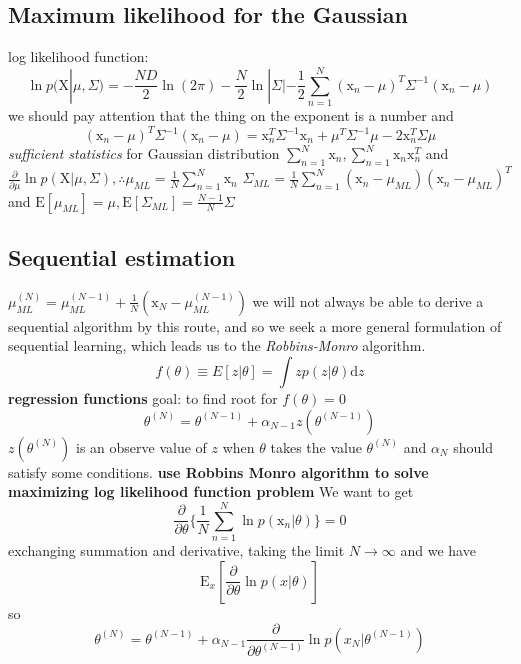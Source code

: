 \documentclass[a4paper]{book}
\begin{document}
\subsection{Maximum likelihood for the Gaussian }
log likelihood function:
\begin{equation}\label{1.2.12}
  \ln p(\mathrm X|\mu,\Sigma) = -\frac{ND}2\ln(2\pi) - \frac N2\ln|\Sigma|-\frac12\sum_{n=1}^N(\mathrm x_n-\mu)^T\Sigma^{-1}(\mathrm x_n-\mu)
\end{equation}
we should pay attention that the thing on the exponent is a number and
\begin{equation}\label{1.2.13}
  (\mathrm x_n-\mu)^T\Sigma^{-1}(\mathrm x_n-\mu) = \mathrm x_n^T\Sigma^{-1}\mathrm x_n+\mu^T\Sigma^{-1}\mu-2\mathrm x_n^T\Sigma\mu
\end{equation}
\emph{sufficient statistics} for Gaussian distribution $\sum_{n=1}^N\mathrm x_n, \sum_{n=1}^N\mathrm x_n\mathrm x_n^T$ and  $\frac{\partial}{\partial \mu}\ln p(\mathrm X|\mu,\Sigma), \therefore\mu_{ML} = \frac1N\sum_{n=1}^N\mathrm x_n$\newline
$\Sigma_{ML}=\frac1N\sum_{n=1}^N(\mathrm x_n-\mu_{ML})(\mathrm x_n-\mu_{ML})^T $
\newline
and $\mathrm E[\mu_{ML}] =\mu, \mathrm E[\Sigma_{ML}] = \frac{N-1}{N}\Sigma$
\subsection{Sequential estimation}
$\mu_{ML}^{(N)}=\mu_{ML}^{(N-1)}+\frac1N(\mathrm x_N-\mu_{ML}^{(N-1)})$
we will not always be able to derive a sequential algorithm by this route, and so we seek a more general formulation of sequential learning, which  leads us to the \emph{Robbins-Monro} algorithm.
\begin{equation}\label{1.2.14}
  f(\theta) \equiv E[z|\theta] = \int zp(z|\theta)\mathrm dz
\end{equation}
\textbf{regression functions}
goal: to find root for $f(\theta) = 0$\newline
$$\theta^{(N)} = \theta^{(N-1)}+\alpha_{N-1}z(\theta^{(N-1)})$$
$z(\theta^{(N)})$ is an observe value of $z$ when $\theta$ takes the value $\theta^{(N)}$ and $\alpha_N$ should satisfy some conditions.\newline
\textbf{use Robbins Monro algorithm to solve maximizing log likelihood function problem}\newline
We want to get $$\frac{\partial}{\partial\theta}\{\frac{1}{N}\sum_{n=1}^N\ln p(\mathrm x_n|\theta)\} = 0$$
exchanging summation and derivative, taking the limit $N\rightarrow\infty$ and we have
$$\mathrm E_x[\frac{\partial}{\partial \theta}\ln p(x|\theta)]$$
so $$\theta^{(N)} = \theta^{(N-1)}+\alpha_{N-1}\frac{\partial}{\partial\theta^{(N-1)}}\ln p(x_N|\theta^{(N-1)})$$
\end{document}
